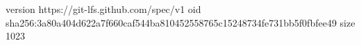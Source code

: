 version https://git-lfs.github.com/spec/v1
oid sha256:3a80a404d622a7f660caf544ba810452558765c15248734fe731bb5f0fbfee49
size 1023
